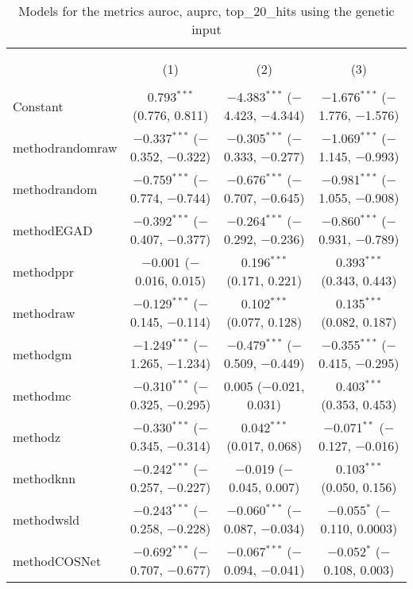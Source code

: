 
\begin{table}[!htbp] \centering 
  \caption{Models for the metrics auroc, auprc, top_20_hits using the genetic input} 
  \label{} 
\begin{tabular}{@{\extracolsep{5pt}}lccc} 
\\[-1.8ex]\hline 
\hline \\[-1.8ex] 
\\[-1.8ex] & (1) & (2) & (3)\\ 
\hline \\[-1.8ex] 
 Constant & 0.793$^{***}$ (0.776, 0.811) & $-$4.383$^{***}$ ($-$4.423, $-$4.344) & $-$1.676$^{***}$ ($-$1.776, $-$1.576) \\ 
  methodrandomraw & $-$0.337$^{***}$ ($-$0.352, $-$0.322) & $-$0.305$^{***}$ ($-$0.333, $-$0.277) & $-$1.069$^{***}$ ($-$1.145, $-$0.993) \\ 
  methodrandom & $-$0.759$^{***}$ ($-$0.774, $-$0.744) & $-$0.676$^{***}$ ($-$0.707, $-$0.645) & $-$0.981$^{***}$ ($-$1.055, $-$0.908) \\ 
  methodEGAD & $-$0.392$^{***}$ ($-$0.407, $-$0.377) & $-$0.264$^{***}$ ($-$0.292, $-$0.236) & $-$0.860$^{***}$ ($-$0.931, $-$0.789) \\ 
  methodppr & $-$0.001 ($-$0.016, 0.015) & 0.196$^{***}$ (0.171, 0.221) & 0.393$^{***}$ (0.343, 0.443) \\ 
  methodraw & $-$0.129$^{***}$ ($-$0.145, $-$0.114) & 0.102$^{***}$ (0.077, 0.128) & 0.135$^{***}$ (0.082, 0.187) \\ 
  methodgm & $-$1.249$^{***}$ ($-$1.265, $-$1.234) & $-$0.479$^{***}$ ($-$0.509, $-$0.449) & $-$0.355$^{***}$ ($-$0.415, $-$0.295) \\ 
  methodmc & $-$0.310$^{***}$ ($-$0.325, $-$0.295) & 0.005 ($-$0.021, 0.031) & 0.403$^{***}$ (0.353, 0.453) \\ 
  methodz & $-$0.330$^{***}$ ($-$0.345, $-$0.314) & 0.042$^{***}$ (0.017, 0.068) & $-$0.071$^{**}$ ($-$0.127, $-$0.016) \\ 
  methodknn & $-$0.242$^{***}$ ($-$0.257, $-$0.227) & $-$0.019 ($-$0.045, 0.007) & 0.103$^{***}$ (0.050, 0.156) \\ 
  methodwsld & $-$0.243$^{***}$ ($-$0.258, $-$0.228) & $-$0.060$^{***}$ ($-$0.087, $-$0.034) & $-$0.055$^{*}$ ($-$0.110, 0.0003) \\ 
  methodCOSNet & $-$0.692$^{***}$ ($-$0.707, $-$0.677) & $-$0.067$^{***}$ ($-$0.094, $-$0.041) & $-$0.052$^{*}$ ($-$0.108, 0.003) \\ 

\end{tabular}
\end{table}
